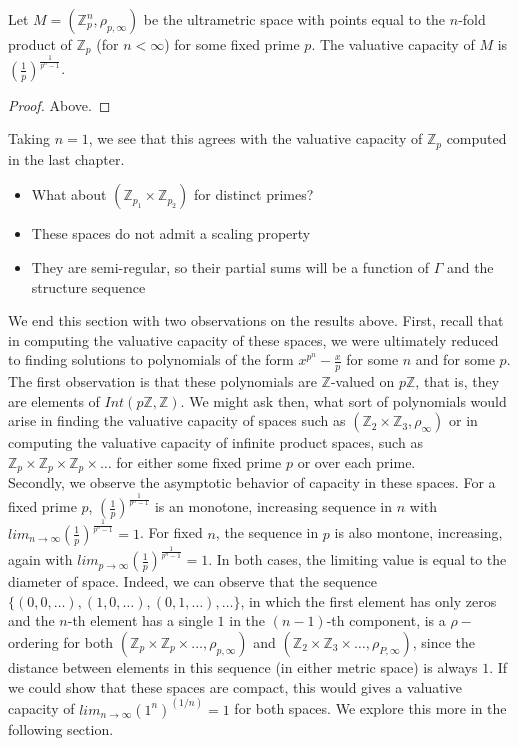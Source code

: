 \begin{proposition*}
Let $M=(\mathbb{Z}_p^n, \rho_{p, \infty})$ be the ultrametric space with points equal to the $n$-fold product of $\mathbb{Z}_p$ (for $n < \infty$) for some fixed prime $p$. The valuative capacity of $M$ is  $(\frac{1}{p})^{\frac{1}{p^n-1}}$.
\end{proposition*}

\begin{proof}
Above.
\end{proof}

Taking $n=1$, we see that this agrees with the valuative capacity of $\mathbb{Z}_p$ computed in the last chapter. \\
\begin{itemize}
\item What about $(\mathbb{Z}_{p_1} \times \mathbb{Z}_{p_2})$ for distinct primes?
\item These spaces do not admit a scaling property
\item They are semi-regular, so their partial sums will be a function of $\Gamma$ and the structure sequence
\end{itemize}

We end this section with two observations on the results above.  First, recall that in computing the valuative capacity of these spaces, we were ultimately reduced to finding solutions to polynomials of the form $x^{p^n} - \frac{x}{p}$ for some $n$ and for some $p$. The first observation is that these polynomials are $\mathbb{Z}$-valued on $p\mathbb{Z}$, that is, they are elements of $Int(p\mathbb{Z},\mathbb{Z})$. We might ask then, what sort of polynomials would arise in finding the valuative capacity of spaces such as $(\mathbb{Z}_2 \times \mathbb{Z}_3, \rho_\infty)$ or in computing the valuative capacity of infinite product spaces, such as $\mathbb{Z}_p \times \mathbb{Z}_p \times \mathbb{Z}_p \times \ldots$ for either some fixed prime $p$ or over each prime. \\

Secondly, we observe the asymptotic behavior of capacity in these spaces. For a fixed prime $p$,  $(\frac{1}{p})^{\frac{1}{p^n-1}}$ is an monotone, increasing sequence in $n$ with $ lim_{n\to\infty} (\frac{1}{p})^{\frac{1}{p^n-1}} =  1$. For fixed $n$, the sequence in $p$ is also montone, increasing, again with  $ lim_{p\to\infty} (\frac{1}{p})^{\frac{1}{p^n-1}}=1$. In both cases, the limiting value is equal to the diameter of space. Indeed, we can observe that the sequence $\{(0,0,\ldots), (1,0,\ldots), (0,1,\ldots), \ldots\}$, in which the first element has only zeros and the $n$-th element has a single $1$ in the $(n-1)$-th component, is a $\rho-$ordering for both  $(\mathbb{Z}_p \times \mathbb{Z}_p \times \ldots, \rho_{p,\infty})$  and  $(\mathbb{Z}_2 \times \mathbb{Z}_3 \times \ldots, \rho_{P,\infty})$, since the distance between elements in this sequence (in either metric space) is always $1$. If we could show that these spaces are compact, this would gives a valuative capacity of $lim_{n\to\infty} (1^n)^{(1/n)} =1$ for both spaces. We explore this more in the following section.\\

